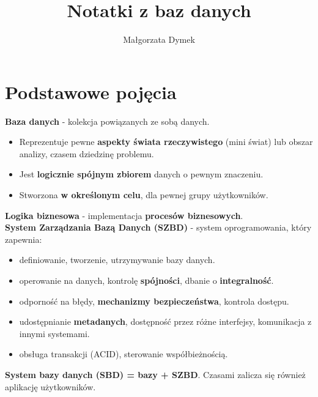 \documentclass[a4paper]{article}
\title{Notatki z baz danych}
\author{Małgorzata Dymek}
\date{}
\begin{document}
\maketitle
\newpage
\tableofcontents
\newpage
\section{Podstawowe pojęcia}

\textbf{Baza danych} -  kolekcja powiązanych ze sobą danych.
\begin{itemize}
    \item Reprezentuje pewne \textbf{aspekty świata rzeczywistego} (mini świat) lub obszar analizy, czasem dziedzinę problemu.
    \item Jest \textbf{logicznie spójnym zbiorem} danych o pewnym znaczeniu.
    \item Stworzona \textbf{w określonym celu}, dla pewnej grupy użytkowników.
\end{itemize}

\textbf{Logika biznesowa} -  implementacja \textbf{procesów biznesowych}.\\

\textbf{System Zarządzania Bazą Danych (SZBD)} - system oprogramowania, który zapewnia: 
\begin{itemize}
    \item definiowanie, tworzenie, utrzymywanie bazy danych.
    \item operowanie na danych, kontrolę \textbf{spójności}, dbanie o \textbf{integralność}.
    \item odporność na błędy, \textbf{mechanizmy bezpieczeństwa}, kontrola dostępu.
    \item udostępnianie \textbf{metadanych}, dostępność przez różne interfejsy, komunikacja z innymi systemami.
    \item obsługa transakcji (ACID), sterowanie współbieżnością.
\end{itemize} 

\textbf{System bazy danych (SBD) = bazy + SZBD}. Czasami zalicza się również aplikację użytkowników.\\
\end{document}

